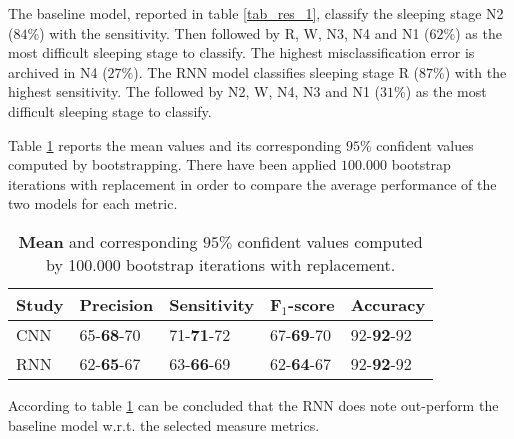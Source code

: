 The baseline model, reported in table \ref{tab_res_1}, classify the sleeping stage N2 ($84\%$) with the sensitivity. Then followed by R, W, N3, N4 and N1 ($62\%$) as the most difficult sleeping stage to classify. The highest misclassification error is archived in N4 ($27\%$).
The RNN model classifies sleeping stage R ($87\%$) with the highest sensitivity. The followed by N2, W, N4, N3 and N1 ($31\%$) as the most difficult sleeping stage to classify. 

Table \ref{tab_res_2} reports the mean values and its corresponding $95\%$ confident values computed by bootstrapping. There have been applied $100.000$ bootstrap iterations with replacement in order to compare the average performance of the two models for each metric. 

\begin{table}[th!]
\centering
\begin{tabular}{l | llll}
Study & Precision & Sensitivity & F$_1$-score & Accuracy \\\hline
CNN               & 65-\textbf{68}-70 & 71-\textbf{71}-72 & 67-\textbf{69}-70 & 92-\textbf{92}-92\\
RNN               & 62-\textbf{65}-67 & 63-\textbf{66}-69 & 62-\textbf{64}-67 & 92-\textbf{92}-92
\end{tabular}
\caption{\textbf{Mean} and corresponding $95\%$ confident values computed by 100.000 bootstrap iterations with replacement.}
\label{tab_res_2}
\end{table}

According to table \ref{tab_res_2} can be concluded that the RNN does note out-perform the baseline model w.r.t. the selected measure metrics.


%




